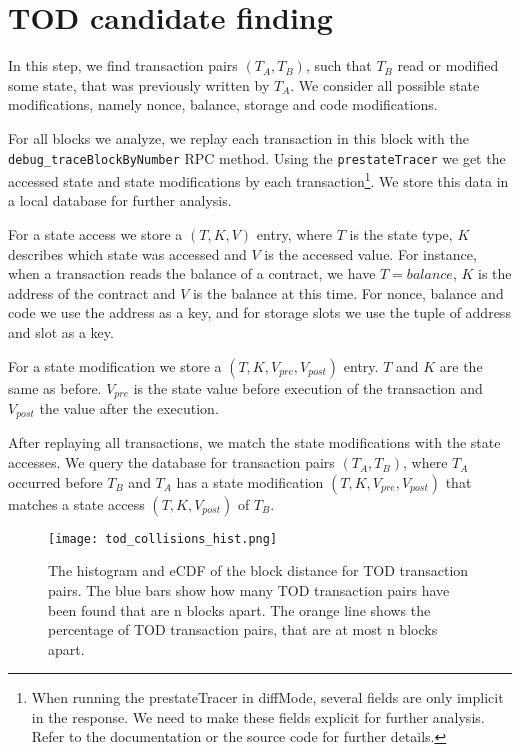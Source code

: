 \documentclass[draft,final]{vutinfth} %
\begin{document}

\section{TOD candidate finding}

In this step, we find transaction pairs $(T_A, T_B)$, such that $T_B$ read or modified some state, that was previously written by $T_A$. We consider all possible state modifications, namely nonce, balance, storage and code modifications.

For all blocks we analyze, we replay each transaction in this block with the \verb|debug_traceBlockByNumber| RPC method. Using the \verb|prestateTracer| we get the accessed state and state modifications by each transaction\footnote{When running the prestateTracer in diffMode, several fields are only implicit in the response. We need to make these fields explicit for further analysis. Refer to the documentation or the source code for further details.}. We store this data in a local database for further analysis.

For a state access we store a $(T, K, V)$ entry, where $T$ is the state type, $K$ describes which state was accessed and $V$ is the accessed value. For instance, when a transaction reads the balance of a contract, we have $T = balance$, $K$ is the address of the contract and $V$ is the balance at this time. For nonce, balance and code we use the address as a key, and for storage slots we use the tuple of address and slot as a key.

For a state modification we store a $(T, K, V_{pre}, V_{post})$ entry. $T$ and $K$ are the same as before. $V_{pre}$ is the state value before execution of the transaction and $V_{post}$ the value after the execution.

After replaying all transactions, we match the state modifications with the state accesses. We query the database for transaction pairs $(T_A, T_B)$, where $T_A$ occurred before $T_B$ and $T_A$ has a state modification $(T, K, V_{pre}, V_{post})$ that matches a state access $(T, K, V_{post})$ of $T_B$.



\begin{figure}[h]
    \centering
    \texttt{[image: tod\_collisions\_hist.png]}
    \caption{The histogram and eCDF of the block distance for TOD transaction pairs. The blue bars show how many TOD transaction pairs have been found that are n blocks apart. The orange line shows the percentage of TOD transaction pairs, that are at most n blocks apart.}
    \label{fig:tod_block_dist}
\end{figure}
\end{document}
